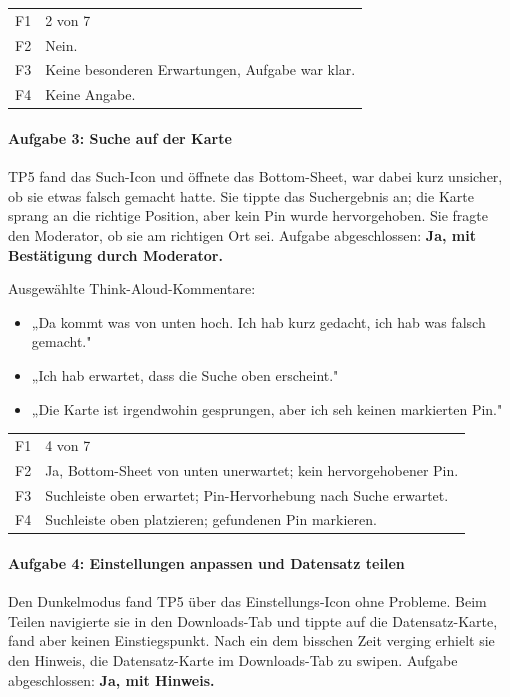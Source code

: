 \documentclass{article}
\begin{document}
\begin{tabular}{@{}lp{10cm}@{}}
  F1 & 2 von 7 \\
  F2 & Nein. \\
  F3 & Keine besonderen Erwartungen, Aufgabe war klar. \\
  F4 & Keine Angabe. \\
\end{tabular}

\paragraph{Aufgabe 3: Suche auf der Karte}

TP5 fand das Such-Icon und öffnete das Bottom-Sheet, war dabei kurz
unsicher, ob sie etwas falsch gemacht hatte. Sie tippte das Suchergebnis
an; die Karte sprang an die richtige Position, aber kein Pin wurde
hervorgehoben. Sie fragte den Moderator, ob sie am richtigen Ort sei.
Aufgabe abgeschlossen: \textbf{Ja, mit Bestätigung durch Moderator.}


Ausgewählte Think-Aloud-Kommentare:
\begin{itemize}
  \item „Da kommt was von unten hoch. Ich hab kurz gedacht, ich hab was
        falsch gemacht."
  \item „Ich hab erwartet, dass die Suche oben erscheint."
  \item „Die Karte ist irgendwohin gesprungen, aber ich seh keinen
        markierten Pin."
\end{itemize}

\begin{tabular}{@{}lp{10cm}@{}}
  F1 & 4 von 7 \\
  F2 & Ja, Bottom-Sheet von unten unerwartet; kein hervorgehobener Pin. \\
  F3 & Suchleiste oben erwartet; Pin-Hervorhebung nach Suche erwartet. \\
  F4 & Suchleiste oben platzieren; gefundenen Pin markieren. \\
\end{tabular}

\paragraph{Aufgabe 4: Einstellungen anpassen und Datensatz teilen}

Den Dunkelmodus fand TP5 über das Einstellungs-Icon ohne Probleme.
Beim Teilen navigierte sie in den Downloads-Tab und tippte auf die
Datensatz-Karte, fand aber keinen Einstiegspunkt. Nach ein dem bisschen Zeit verging
erhielt sie den Hinweis, die Datensatz-Karte im Downloads-Tab zu swipen.
Aufgabe abgeschlossen: \textbf{Ja, mit Hinweis.} 
\end{document}
